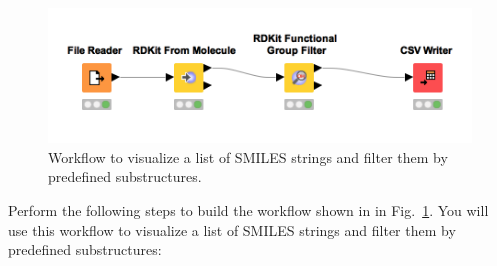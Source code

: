 \begin{figure}
\centering
\includegraphics[width=\textwidth]{graphics/metabo/structures_filter_workflow.png}
\caption{Workflow to visualize a list of SMILES strings and filter them by predefined substructures.}
\label{fig:structures_filter_workflow}
\end{figure}

\noindent Perform the following steps to build the workflow shown in in Fig.~\ref{fig:structures_filter_workflow}. You will use this workflow to visualize a list of SMILES strings and filter them by predefined substructures:

